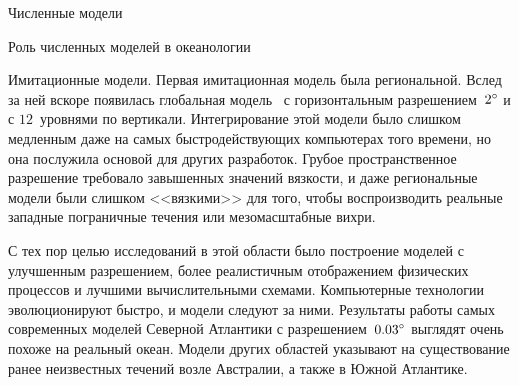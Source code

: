 \begin{chapter}{Численные модели}
\begin{section}{Роль численных моделей в океанологии}
\begin{paragraph}{Имитационные модели.}
Первая имитационная модель была региональной. Вслед за ней вскоре появилась
глобальная модель~\cite{Cox:1975} с горизонтальным разрешением~${2}^\circ$
и с $12$~уровнями по вертикали. Интегрирование этой модели было слишком 
медленным даже на самых быстродействующих компьютерах того времени, 
но она послужила основой для других разработок. Грубое пространственное 
разрешение требовало завышенных значений вязкости, и даже региональные модели 
были слишком <<вязкими>> для того, чтобы воспроизводить реальные 
западные пограничные течения или мезомасштабные 
вихри.
%

С тех пор целью исследований в этой области было построение моделей с 
улучшенным разрешением, более реалистичным отображением физических процессов
и лучшими вычислительными схемами. Компьютерные технологии эволюционируют 
быстро, и модели следуют за ними. Результаты работы самых современных моделей
Северной Атлантики с разрешением~${0.03}^\circ$ выглядят очень похоже на
реальный океан. Модели других областей указывают на существование ранее
неизвестных течений возле Австралии, а также в Южной Атлантике.
%
\end{paragraph}


\end{section}
\end{chapter}

